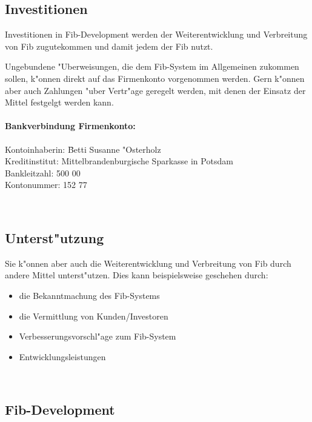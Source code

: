 \documentclass[12pt,a4paper]{article}
\begin{document}
\subsection{Investitionen}

Investitionen in Fib-Development werden der Weiterentwicklung und Verbreitung von Fib zugutekommen und damit jedem der Fib nutzt.

Ungebundene "Uberweisungen, die dem Fib-System im Allgemeinen zukommen sollen, k"onnen direkt auf das Firmenkonto vorgenommen werden.
Gern k"onnen aber auch Zahlungen "uber Vertr"age geregelt werden, mit denen der Einsatz der Mittel festgelgt werden kann.

\paragraph{Bankverbindung Firmenkonto:}

\begin{tabbing}
Kontoinhaberin: \hspace{1cm}\= Betti Susanne "Osterholz\\
Kreditinstitut:\> Mittelbrandenburgische Sparkasse in Potsdam\\
Bankleitzahl:  500 00\\
Kontonummer:  152 77\\
\end{tabbing}
\ \vspace{-1.0cm}

\subsection{Unterst"utzung}

Sie k"onnen aber auch die Weiterentwicklung und Verbreitung von Fib durch andere Mittel unterst"utzen.
Dies kann beispielsweise geschehen durch:
\begin{itemize}
 \item die Bekanntmachung des Fib-Systems
 \item die Vermittlung von Kunden/Investoren
 \item Verbesserungsvorschl"age zum Fib-System
 \item Entwicklungsleistungen
\end{itemize}
\ \vspace{-0.60cm}

\subsection{Fib-Development}
\end{document}
